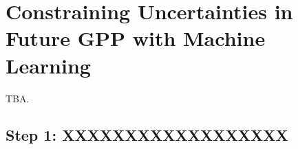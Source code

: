 


\chapter{Constraining Uncertainties in Future \acl{GPP} with Machine Learning}
\label{ch:06:paper_gpp}

TBA.


\section{Step 1: XXXXXXXXXXXXXXXXXX}
\label{sec:06:step_1}